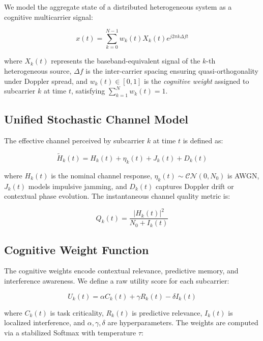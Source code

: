 \documentclass[journal,10pt,twocolumn,twoside]{IEEEtran}
\begin{document}
We model the aggregate state of a distributed heterogeneous system as a cognitive multicarrier signal:

\begin{equation}
x(t) = \sum_{k=0}^{N-1} w_k(t) X_k(t) e^{j2\pi k \Delta f t}
\label{eq:mcm}
\end{equation}

where $X_k(t)$ represents the baseband-equivalent signal of the $k$-th heterogeneous source, $\Delta f$ is the inter-carrier spacing ensuring quasi-orthogonality under Doppler spread, and $w_k(t) \in [0,1]$ is the \textit{cognitive weight} assigned to subcarrier $k$ at time $t$, satisfying $\sum_{k=1}^{N} w_k(t) = 1$.

\subsection{Unified Stochastic Channel Model}

The effective channel perceived by subcarrier $k$ at time $t$ is defined as:

\begin{equation}
\tilde{H}_k(t) = H_k(t) + \eta_k(t) + J_k(t) + D_k(t)
\label{eq:channel}
\end{equation}

where $H_k(t)$ is the nominal channel response, $\eta_k(t) \sim \mathcal{CN}(0, N_0)$ is AWGN, $J_k(t)$ models impulsive jamming, and $D_k(t)$ captures Doppler drift or contextual phase evolution. The instantaneous channel quality metric is:

\begin{equation}
Q_k(t) = \frac{|H_k(t)|^2}{N_0 + I_k(t)}
\label{eq:qmetric}
\end{equation}

\subsection{Cognitive Weight Function}

The cognitive weights encode contextual relevance, predictive memory, and interference awareness. We define a raw utility score for each subcarrier:

\begin{equation}
U_k(t) = \alpha C_k(t) + \gamma R_k(t) - \delta I_k(t)
\label{eq:utility}
\end{equation}

where $C_k(t)$ is task criticality, $R_k(t)$ is predictive relevance, $I_k(t)$ is localized interference, and $\alpha, \gamma, \delta$ are hyperparameters. The weights are computed via a stabilized Softmax with temperature $\tau$:
\end{document}
